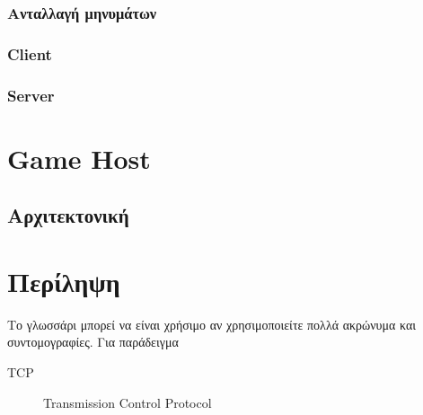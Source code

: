 \documentclass[oneside, 12pt]{book}
\begin{document}
			\subsection{Ανταλλαγή μηνυμάτων}
			
			\subsection{Client}	
			
			\subsection{Server}	

	\chapter{Game Host}
	\section{Αρχιτεκτονική}		
	
	\chapter{Περίληψη}
	
	\begin{Glossary}
		Το γλωσσάρι μπορεί να είναι χρήσιμο αν χρησιμοποιείτε πολλά ακρώνυμα
		και συντομογραφίες. Για παράδειγμα
		\begin{description}
			\item[TCP]Transmission Control Protocol
		\end{description}
	\end{Glossary}
	
	\printbibliography
	
\end{document}
